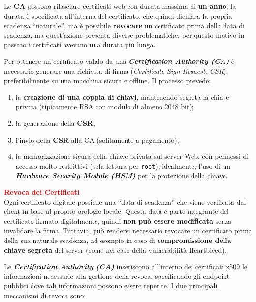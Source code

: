 \begin{flushleft}
    Le \textbf{CA} possono rilasciare certificati web con durata massima di \textbf{un anno}, la durata è specificata all'interna del certificato, che quindi dichiara la propria scadenza ``naturale'', ma è possibile \textbf{revocare} un certificato prima della data di scadenza, ma quest'azione presenta diverse problematiche, per questo motivo in passato i certificati avevano una durata più lunga.

    \smallskip

    Per ottenere un certificato valido da una \textbf{\textit{Certification Authority (CA)}} è necessario generare una richiesta di firma (\textit{Certificate Sign Request, CSR}), preferibilmente su una macchina sicura e offline. Il processo prevede: 
    \begin{enumerate}[nosep]
        \item la \textbf{creazione di una coppia di chiavi}, mantenendo segreta la chiave privata (tipicamente RSA con modulo di almeno 2048 bit);
        \item la generazione della \textbf{CSR};
        \item l'invio della \textbf{CSR} alla CA (solitamente a pagamento);
        \item la memorizzazione sicura della chiave privata sul server Web, con permessi di accesso molto restrittivi (sola lettura per \texttt{root}); idealmente, l'uso di un \textbf{\textit{Hardware Security Module (HSM)}} per la protezione della chiave.
    \end{enumerate}

    \smallskip

    \textcolor{red}{\textbf{Revoca dei Certificati}} \\
    Ogni certificato digitale possiede una ``data di scadenza'' che viene verificata dal client in base al proprio orologio locale. Questa data è parte integrante del certificato firmato digitalmente, quindi \textbf{non può essere modificata} senza invalidare la firma. Tuttavia, può rendersi necessario revocare un certificato prima della sua naturale scadenza, ad esempio in caso di \textbf{compromissione della chiave segreta} del server (come nel caso della vulnerabilità Heartbleed). 

    Le \textbf{\textit{Certification Authority (CA)}} inseriscono all'interno dei certificati x509 le informazioni necessarie alla gestione della revoca, specificando gli endpoint pubblici dove tali informazioni possono essere reperite. I due principali meccanismi di revoca sono:


\end{flushleft}
